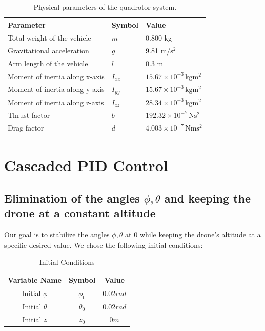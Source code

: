 \documentclass[a4paper,12pt]{article}
\begin{document}
\begin{table}[h!]
\centering
\caption{Physical parameters of the quadrotor system.}
\begin{tabular}{lll}
\toprule
\textbf{Parameter} & \textbf{Symbol} & \textbf{Value} \\
\midrule
Total weight of the vehicle         & \( m \)   & 0.800 kg \\
Gravitational acceleration          & \( g \)   & 9.81
\(\si{\meter\per\second\squared}\) \\
Arm length of the vehicle           & \( l \)   & 0.3 m \\
Moment of inertia along x-axis      & \( I_{xx} \) & \( 15.67 \times 10^{-3} \, \si{\kilogram\meter\squared} \) \\
Moment of inertia along y-axis      & \( I_{yy} \) & \( 15.67 \times 10^{-3} \, \si{\kilogram\meter\squared} \) \\
Moment of inertia along z-axis      & \( I_{zz} \) & \( 28.34 \times 10^{-3} \, \si{\kilogram\meter\squared} \) \\
Thrust factor                       & \( b \)   & \( 192.32 \times 10^{-7} \, \si{\newton\second\squared} \) \\
Drag factor                         & \( d \)   & \( 4.003 \times 10^{-7} \, \si{\newton\meter\second\squared} \) \\
\bottomrule
\end{tabular}
\end{table}
\newpage









\section{Cascaded PID Control}
\subsection{Elimination of the angles $\phi, \theta$ and keeping the drone at a constant altitude}\label{3.1}
Our goal is to stabilize the angles $\phi, \theta$ at $0$ while keeping the drone's altitude at a specific desired value. We chose the following initial conditions:
\begin{table}[h!]
\centering
\caption{Initial Conditions}
\begin{tabular}{|c|c|c|}
\hline
\textbf{Variable Name} & \textbf{Symbol} & \textbf{Value} \\ \hline
Initial $\phi$ & $\phi_0$ & $0.02 rad$ \\ \hline
Initial $\theta$ & $\theta_0$  & $0.02 rad$ \\ \hline
Initial $z$ & $z_0$  & $0 m$ \\ \hline
\end{tabular}
\end{table}
\end{document}
